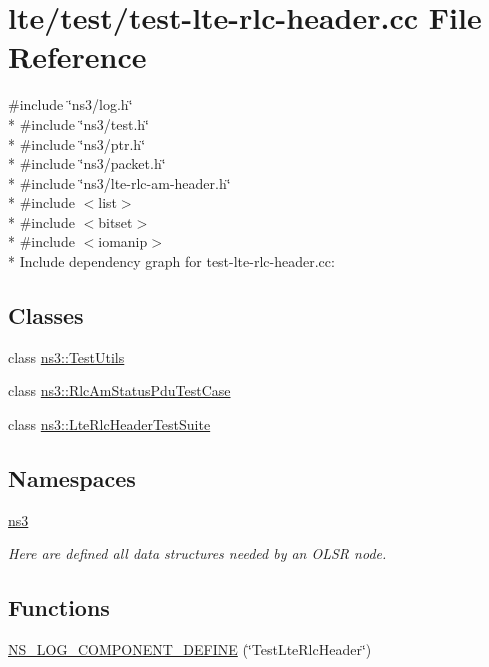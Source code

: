 \hypertarget{test-lte-rlc-header_8cc}{}\section{lte/test/test-\/lte-\/rlc-\/header.cc File Reference}
\label{test-lte-rlc-header_8cc}
{\ttfamily \#include \char`\"{}ns3/log.\+h\char`\"{}}\\*
{\ttfamily \#include \char`\"{}ns3/test.\+h\char`\"{}}\\*
{\ttfamily \#include \char`\"{}ns3/ptr.\+h\char`\"{}}\\*
{\ttfamily \#include \char`\"{}ns3/packet.\+h\char`\"{}}\\*
{\ttfamily \#include \char`\"{}ns3/lte-\/rlc-\/am-\/header.\+h\char`\"{}}\\*
{\ttfamily \#include $<$list$>$}\\*
{\ttfamily \#include $<$bitset$>$}\\*
{\ttfamily \#include $<$iomanip$>$}\\*
Include dependency graph for test-\/lte-\/rlc-\/header.cc\+:
\subsection*{Classes}
\begin{DoxyCompactItemize}
\item 
class \hyperlink{classns3_1_1TestUtils}{ns3\+::\+Test\+Utils}
\item 
class \hyperlink{classns3_1_1RlcAmStatusPduTestCase}{ns3\+::\+Rlc\+Am\+Status\+Pdu\+Test\+Case}
\item 
class \hyperlink{classns3_1_1LteRlcHeaderTestSuite}{ns3\+::\+Lte\+Rlc\+Header\+Test\+Suite}
\end{DoxyCompactItemize}
\subsection*{Namespaces}
\begin{DoxyCompactItemize}
\item 
 \hyperlink{namespacens3}{ns3}
\begin{DoxyCompactList}\small\item\em Here are defined all data structures needed by an O\+L\+SR node. \end{DoxyCompactList}\end{DoxyCompactItemize}
\subsection*{Functions}
\begin{DoxyCompactItemize}
\item 
\hyperlink{test-lte-rlc-header_8cc_a0d071fa290de5780dc3bb048c51b7071}{N\+S\+\_\+\+L\+O\+G\+\_\+\+C\+O\+M\+P\+O\+N\+E\+N\+T\+\_\+\+D\+E\+F\+I\+NE} (\char`\"{}Test\+Lte\+Rlc\+Header\char`\"{})
\end{DoxyCompactItemize}
